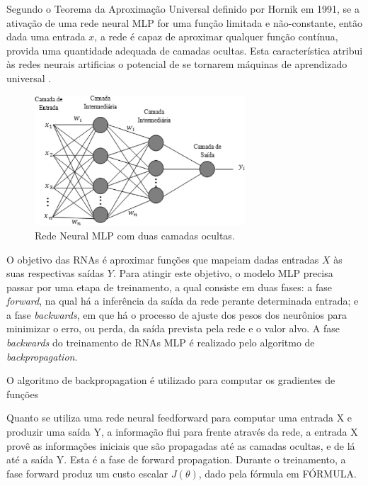 Segundo o Teorema da Aproximação Universal definido por Hornik em 1991, se a ativação de uma rede neural MLP for uma função limitada e não-constante, então dada uma entrada $x$, a rede é capaz de aproximar qualquer função contínua, provida uma quantidade adequada de camadas ocultas. Esta característica atribui às redes neurais artificias o potencial de se tornarem máquinas de aprendizado universal \cite{hornik1991approximation}.

\begin{figure}[ht]
	\centering
	\caption{Rede Neural MLP com duas camadas ocultas.}
	\label{fig:mlp}
	\includegraphics[width=0.7\textwidth]{img/mlprna.jpg}
\end{figure}

O objetivo das RNAs é aproximar funções que mapeiam dadas entradas $X$ às suas respectivas saídas $Y$. Para atingir este objetivo, o modelo MLP precisa passar por uma etapa de treinamento, a qual consiste em duas fases: a fase \emph{forward}, na qual há a inferência da saída da rede perante determinada entrada; e a fase \emph{backwards}, em que há o processo de ajuste dos pesos dos neurônios para minimizar o erro, ou perda, da saída prevista pela rede e o valor alvo. A fase \emph{backwards} do treinamento de RNAs MLP é realizado pelo algoritmo de \emph{backpropagation}. 




O algoritmo de backpropagation é utilizado para computar os gradientes de funções

Quanto se utiliza uma rede neural feedforward para computar uma entrada X e produzir uma saída Y, a informação flui para frente através da rede, a entrada X provê as informações iniciais que são propagadas até as camadas ocultas, e de lá até a saída Y. Esta é a fase de forward propagation. Durante o treinamento, a fase forward produz um custo escalar $J(\theta)$, dado pela fórmula em FÓRMULA.

